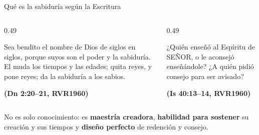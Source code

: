 \documentclass[hyperref={bookmarks=false},aspectratio=169]{beamer}
\newcommand{\SENOR}{S{\fontsize{0.78em}{1em}\selectfont EÑOR}}
\newcommand{\fuente}[1]{\par\hfill{\upshape\bfseries\footnotesize\textcolor{azul}{#1}}}
\newcommand{\destacar}[1]{\textbf{\textcolor{azul}{#1}}}
\begin{document}
\begin{frame}{Qué es la sabiduría según la Escritura}
\centering
{}\par\medskip
\begin{columns}[t,onlytextwidth]
\begin{column}{0.49\textwidth}
\begin{cita}Sea bendito el nombre de Dios de siglos en siglos, porque suyos son el poder y la sabiduría. El muda los tiempos y las edades; quita reyes, y pone reyes; da la sabiduría a los sabios.\fuente{(Dn 2:20--21, RVR1960)}\end{cita}
\end{column}
\begin{column}{0.49\textwidth}
\begin{cita}¿Quién enseñó al Espíritu de \SENOR, o le aconsejó enseñándole? ¿A quién pidió consejo para ser avisado?\fuente{(Is 40:13--14, RVR1960)}\end{cita}
\end{column}
\end{columns}
\small\centering No es solo conocimiento: es \destacar{maestría creadora}, \destacar{habilidad para sostener} su creación y sus tiempos y \destacar{diseño perfecto} de redención y consejo.
\end{frame}
\end{document}
